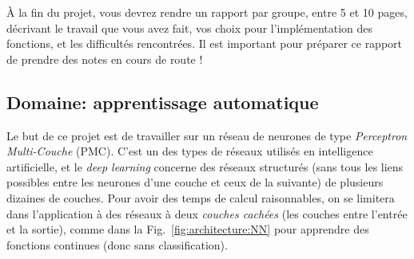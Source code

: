 \documentclass[a4paper]{article}
\begin{document}
À la fin du projet, vous devrez rendre un rapport par groupe, entre 5
et 10 pages, décrivant le travail que vous avez fait, vos choix pour
l'implémentation des fonctions, et les difficultés rencontrées. Il
est important pour préparer ce rapport de prendre des notes en cours
de route !

\subsection{Domaine: apprentissage automatique}

Le but de ce projet est de travailler sur un réseau de neurones de
type \emph{Perceptron Multi-Couche} (PMC). C'est un des types de
réseaux utilisés en intelligence artificielle, et le \emph{deep
  learning} concerne des réseaux structurés (sans tous les liens
possibles entre les neurones d'une couche et ceux de la suivante) de
plusieurs dizaines de couches. Pour avoir des temps de calcul
raisonnables, on se limitera dans l'application à des réseaux à deux
\emph{couches cachées} (les couches entre l'entrée et la sortie),
comme dans la Fig.~\ref{fig:architecture:NN} pour apprendre des
fonctions continues (donc sans classification).
\end{document}
